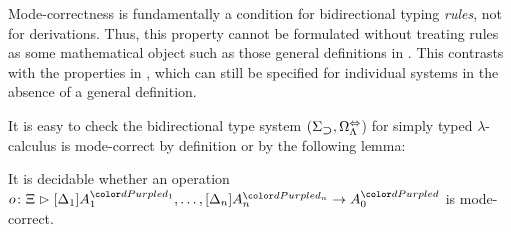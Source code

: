 \begin{remark}
  Mode-correctness is fundamentally a condition for bidirectional typing \emph{rules}, not for derivations.
  Thus, this property cannot be formulated without treating rules as some mathematical object such as those general definitions in .
  This contrasts with the properties in , which can still be specified for individual systems in the absence of a general definition.
\end{remark}

It is easy to check the bidirectional type system $(\Sigma_{\mathbin{\bm{\supset}}}, \Omega^{\Leftrightarrow}_{\Lambda}$) for simply typed $\lambda$-calculus is mode-correct by definition or by the following lemma:
\begin{lemma}\label{lem:decidability-mode-correctness}
  It is decidable whether an operation $\biop$ is mode-correct.
\end{lemma}


